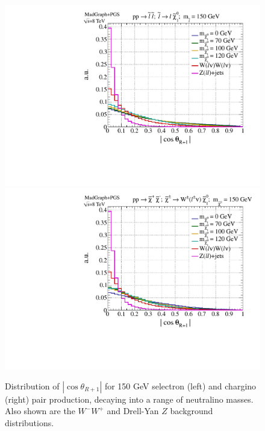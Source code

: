 \begin{figure}[ht]
\includegraphics[width=0.45\columnwidth]{fig/sectionII/costheta_slepton.pdf}
\includegraphics[width=0.45\columnwidth]{fig/sectionII/costheta_chargino.pdf}
\caption{Distribution of $|\cos\theta_{R+1}|$ for 150 GeV selectron (left) and chargino (right) pair production, decaying into a range of neutralino masses. Also shown are the $W^-W^+$ and Drell-Yan $Z$ background distributions. \label{fig:costheta}}
\end{figure}

